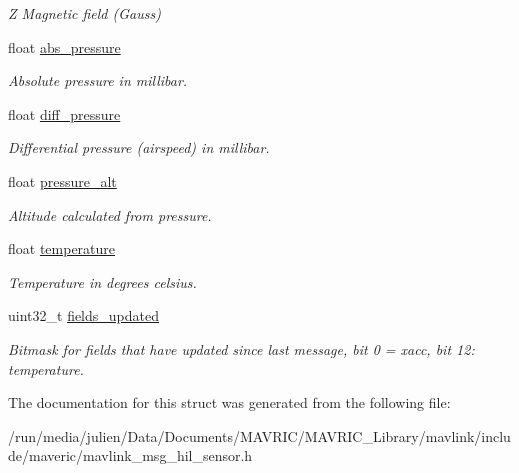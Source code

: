 \begin{DoxyCompactItemize}
\begin{DoxyCompactList}\small\item\em Z Magnetic field (Gauss) \end{DoxyCompactList}\item 
\hypertarget{struct____mavlink__hil__sensor__t_a7d05535dddd4be7c92b616ea644cb6cd}{float \hyperlink{struct____mavlink__hil__sensor__t_a7d05535dddd4be7c92b616ea644cb6cd}{abs\+\_\+pressure}}\label{struct____mavlink__hil__sensor__t_a7d05535dddd4be7c92b616ea644cb6cd}

\begin{DoxyCompactList}\small\item\em Absolute pressure in millibar. \end{DoxyCompactList}\item 
\hypertarget{struct____mavlink__hil__sensor__t_a614e2fe0a712bc9619669950f09dd21d}{float \hyperlink{struct____mavlink__hil__sensor__t_a614e2fe0a712bc9619669950f09dd21d}{diff\+\_\+pressure}}\label{struct____mavlink__hil__sensor__t_a614e2fe0a712bc9619669950f09dd21d}

\begin{DoxyCompactList}\small\item\em Differential pressure (airspeed) in millibar. \end{DoxyCompactList}\item 
\hypertarget{struct____mavlink__hil__sensor__t_aa7347c28c478d103f181d57aee8026de}{float \hyperlink{struct____mavlink__hil__sensor__t_aa7347c28c478d103f181d57aee8026de}{pressure\+\_\+alt}}\label{struct____mavlink__hil__sensor__t_aa7347c28c478d103f181d57aee8026de}

\begin{DoxyCompactList}\small\item\em Altitude calculated from pressure. \end{DoxyCompactList}\item 
\hypertarget{struct____mavlink__hil__sensor__t_a775825e9a485480f835e1b01c9ef878a}{float \hyperlink{struct____mavlink__hil__sensor__t_a775825e9a485480f835e1b01c9ef878a}{temperature}}\label{struct____mavlink__hil__sensor__t_a775825e9a485480f835e1b01c9ef878a}

\begin{DoxyCompactList}\small\item\em Temperature in degrees celsius. \end{DoxyCompactList}\item 
\hypertarget{struct____mavlink__hil__sensor__t_a47ccb8d87933c760160e5f6f513f0e90}{uint32\+\_\+t \hyperlink{struct____mavlink__hil__sensor__t_a47ccb8d87933c760160e5f6f513f0e90}{fields\+\_\+updated}}\label{struct____mavlink__hil__sensor__t_a47ccb8d87933c760160e5f6f513f0e90}

\begin{DoxyCompactList}\small\item\em Bitmask for fields that have updated since last message, bit 0 = xacc, bit 12\+: temperature. \end{DoxyCompactList}\end{DoxyCompactItemize}


The documentation for this struct was generated from the following file\+:\begin{DoxyCompactItemize}
\item 
/run/media/julien/\+Data/\+Documents/\+M\+A\+V\+R\+I\+C/\+M\+A\+V\+R\+I\+C\+\_\+\+Library/mavlink/include/maveric/mavlink\+\_\+msg\+\_\+hil\+\_\+sensor.\+h\end{DoxyCompactItemize}
